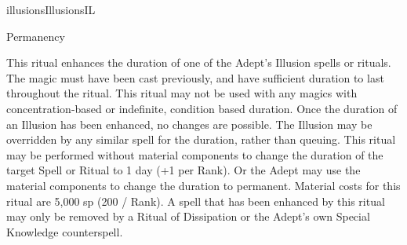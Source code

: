 \begin{College}[1.5]{illusions}{Illusions}{IL}
\begin{ritual}[R-3]{Permanency}
\begin{effects}
This ritual enhances the duration of one of the Adept’s Illusion
spells or rituals.  The magic must have been cast previously, and have
sufficient duration to last throughout the ritual.  This ritual may
not be used with any magics with concentration-based or indefinite,
condition based duration.  Once the duration of an Illusion has been
enhanced, no changes are possible. The Illusion may be overridden by
any similar spell for the duration, rather than queuing.  This ritual
may be performed without material components to change the duration of
the target Spell or Ritual to 1 day (+1 per Rank).  Or the Adept may
use the material components to change the duration to permanent.
Material costs for this ritual are 5,000 sp (200 / Rank).  A spell
that has been enhanced by this ritual may only be removed by a Ritual
of Dissipation or the Adept’s own Special Knowledge counterspell.
\end{effects}
\end{ritual}
\end{College}
